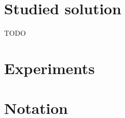 \documentclass{book}
\theoremstyle{definition}
\theoremstyle{definition}
\theoremstyle{definition}
\begin{document}
\chapter{Studied solution}
	TODO
\chapter{Experiments}
  
  


%   

\appendix
\chapter{Notation}



\newpage
{}

\end{document}
